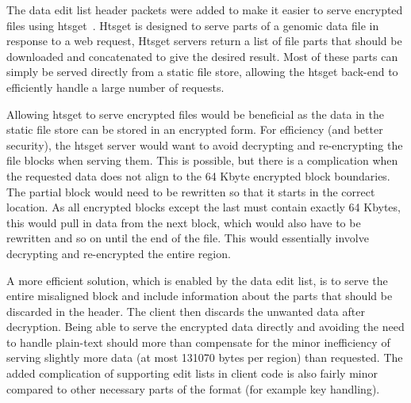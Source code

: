 \documentclass[10pt]{article}
\begin{document}
The data edit list header packets were added to make it easier to serve encrypted files using htsget~\cite{htsget}.
Htsget is designed to serve parts of a genomic data file in response to a web request,
Htsget servers return a list of file parts that should be downloaded and concatenated to give the desired result.
Most of these parts can simply be served directly from a static file store, allowing the htsget back-end to efficiently
handle a large number of requests.

Allowing htsget to serve encrypted files would be beneficial as the data in the static file store can be stored in
an encrypted form.
For efficiency (and better security),
the htsget server would want to avoid decrypting and re-encrypting the file blocks when serving them.
This is possible,
but there is a complication when the requested data does not align to the 64 Kbyte encrypted block boundaries.
The partial block would need to be rewritten so that it starts in the correct location.
As all encrypted blocks except the last must contain exactly 64 Kbytes, this would pull in data from the next block,
which would also have to be rewritten and so on until the end of the file.
This would essentially involve decrypting and re-encrypted the entire region.

A more efficient solution, which is enabled by the data edit list, is to serve the entire misaligned block and
include information about the parts that should be discarded in the header.
The client then discards the unwanted data after decryption.
Being able to serve the encrypted data directly and avoiding the need to handle plain-text should more than
compensate for the minor inefficiency of serving slightly more data (at most 131070 bytes per region) than requested.
The added complication of supporting edit lists in client code is also fairly minor compared to other
necessary parts of the format (for example key handling).
\end{document}
